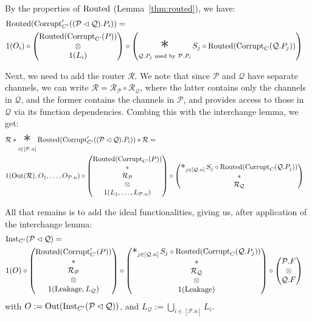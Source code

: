 \begin{theorem}
By the properties of $\text{Routed}$ (Lemma~\ref{thm:routed}), we have:
$$
\begin{aligned}
&\tx{Routed}(\tx{Corrupt}'_{C'}((\mathcal{P} \lhd \mathcal{Q}).P_i)) =\cr
&1(O_i) \circ
\begin{pmatrix}
  \tx{Routed}(\tx{Corrupt}_{\tx{C'}}(P))\cr
  \otimes\cr
  1(L_i)
\end{pmatrix}
\circ
\left(
\bigast_{\mathcal{Q}.P_j \tx{ used by } \mathcal{P}.P_i}
  S_j \circ \tx{Routed}(\tx{Corrupt}_C(\mathcal{Q}.P_j))
\right)
\end{aligned}
$$

Next, we need to add the router $\mathcal{R}$.
We note that since $\mathcal{P}$ and $\mathcal{Q}$ have separate channels,
we can write $\mathcal{R} = \mathcal{R}_{\mathcal{P}} \circ \mathcal{R}_{\mathcal{Q}}$,
where the latter contains only the channels in $\mathcal{Q}$,
and the former contains the channels in $\mathcal{P}$,
and provides access to those in $\mathcal{Q}$ via its function dependencies.
Combing this with the interchange lemma, we get:
$$
\begin{aligned}
&\mathcal{R} * \bigast_{i \in [\mathcal{P}.n]}\tx{Routed}(\tx{Corrupt}'_{C'}((\mathcal{P} \lhd \mathcal{Q}).P_i)) * \mathcal{R} =\cr
&1(\tx{Out}(\mathcal{R}), O_1, \ldots, O_{\mathcal{P}.n}) \circ
\begin{pmatrix}
  \tx{Routed}(\tx{Corrupt}_{\tx{C'}}(P))\cr
  *\cr
  \mathcal{R}_{\mathcal{P}}\cr
  \otimes\cr
  1(L_1, \ldots, L_{\mathcal{P}.n})
\end{pmatrix}
\circ
\begin{pmatrix}
\bigast_{j \in [\mathcal{Q}.n]}
  S_j \circ \tx{Routed}(\tx{Corrupt}_C(\mathcal{Q}.P_j))
  \cr
  *\cr
  \mathcal{R}_{\mathcal{Q}}
\end{pmatrix}
\end{aligned}
$$

All that remains is to add the ideal functionalities, giving us,
after application of the interchange lemma:
$$
\begin{aligned}
  &\tx{Inst}_{C'}(\mathcal{P} \lhd \mathcal{Q}) =\cr
&1(O) \circ
\begin{pmatrix}
  \tx{Routed}(\tx{Corrupt}'_{\tx{C'}}(P))\cr
  *\cr
  \mathcal{R}_{\mathcal{P}}\cr
  \otimes\cr
  1(\tx{Leakage}, L_{\mathcal{Q}})
\end{pmatrix}
\circ
\begin{pmatrix}
\bigast_{j \in [\mathcal{Q}.n]}
  S_j \circ \tx{Routed}(\tx{Corrupt}_C(\mathcal{Q}.P_j))
  \cr
  *\cr
  \mathcal{R}_{\mathcal{Q}}\cr
  \otimes\cr
  1(\tx{Leakage})
\end{pmatrix}
\circ
\begin{pmatrix}
  \mathcal{P}.F\cr
  \otimes\cr
  \mathcal{Q}.F
\end{pmatrix}
\end{aligned}
$$
with $O := \text{Out}(\text{Inst}_{C'}(\mathcal{P} \lhd \mathcal{Q}))$,
and $L_{\mathcal{Q}} := \bigcup_{i \in [\mathcal{P}.n]} L_i$.


\end{theorem}
